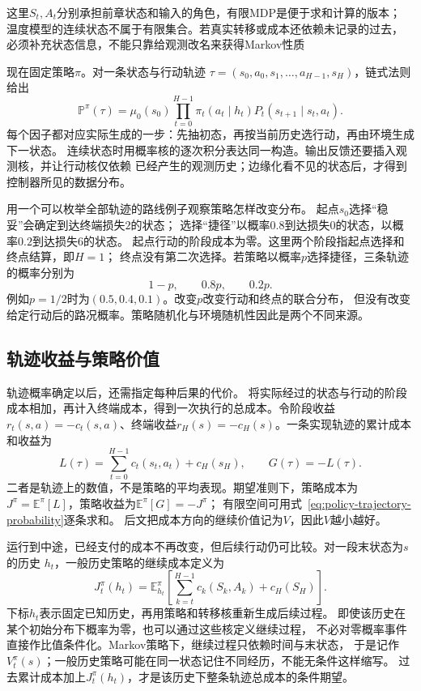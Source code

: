 这里$S_t,A_t$分别承担前章状态和输入的角色，有限MDP是便于求和计算的版本；
温度模型的连续状态不属于有限集合。若真实转移或成本还依赖未记录的过去，
必须补充状态信息，不能只靠给观测改名来获得Markov性质

现在固定策略$\pi$。对一条状态与行动轨迹
$\tau=(s_0,a_0,s_1,\ldots,a_{H-1},s_H)$，链式法则给出
\begin{equation}
  \mathbb P^\pi(\tau)
  =\mu_0(s_0)\prod_{t=0}^{H-1}
    \pi_t(a_t\mid h_t)P_t(s_{t+1}\mid s_t,a_t).
  \label{eq:policy-trajectory-probability}
\end{equation}
每个因子都对应实际生成的一步：先抽初态，再按当前历史选行动，再由环境生成下一状态。
连续状态时用概率核的逐次积分表达同一构造。输出反馈还要插入观测核，并让行动核仅依赖
已经产生的观测历史；边缘化看不见的状态后，才得到控制器所见的数据分布。

用一个可以枚举全部轨迹的路线例子观察策略怎样改变分布。
起点$s_0$选择“稳妥”会确定到达终端损失$2$的状态；
选择“捷径”以概率$0.8$到达损失$0$的状态，以概率$0.2$到达损失$6$的状态。
起点行动的阶段成本为零。这里两个阶段指起点选择和终点结算，即$H=1$；
终点没有第二次选择。若策略以概率$p$选择捷径，三条轨迹的概率分别为
\[
  1-p,\qquad 0.8p,\qquad 0.2p.
\]
例如$p=1/2$时为$(0.5,0.4,0.1)$。改变$p$改变行动和终点的联合分布，
但没有改变给定行动后的路况概率。策略随机化与环境随机性因此是两个不同来源。

\subsection{轨迹收益与策略价值}
\label{sec:policy-trajectory-return}

轨迹概率确定以后，还需指定每种后果的代价。
将实际经过的状态与行动的阶段成本相加，再计入终端成本，得到一次执行的总成本。令阶段收益
$r_t(s,a)=-c_t(s,a)$、终端收益$r_H(s)=-c_H(s)$。一条实现轨迹的累计成本和收益为
\begin{equation}
  L(\tau)=\sum_{t=0}^{H-1}c_t(s_t,a_t)+c_H(s_H),
  \qquad G(\tau)=-L(\tau).
  \label{eq:policy-trajectory-cost-return}
\end{equation}
二者是轨迹上的数值，不是策略的平均表现。期望准则下，策略成本为
$J^\pi=\mathbb E^\pi[L]$，策略收益为$\mathbb E^\pi[G]=-J^\pi$；
有限空间可用式~\eqref{eq:policy-trajectory-probability}逐条求和。
后文把成本方向的继续价值记为$V$，因此$V$越小越好。

运行到中途，已经支付的成本不再改变，但后续行动仍可比较。对一段末状态为$s$的历史
$h_t$，一般历史策略的继续成本定义为
\begin{equation}
  J_t^\pi(h_t)=
  \mathbb E^\pi_{h_t}
  \left[\sum_{k=t}^{H-1}c_k(S_k,A_k)+c_H(S_H)\right].
  \label{eq:decision-finite-policy-value}
\end{equation}
下标$h_t$表示固定已知历史，再用策略和转移核重新生成后续过程。
即使该历史在某个初始分布下概率为零，也可以通过这些核定义继续过程，
不必对零概率事件直接作比值条件化。Markov策略下，继续过程只依赖时间与末状态，
于是记作$V_t^\pi(s)$；一般历史策略可能在同一状态记住不同经历，不能无条件这样缩写。
过去累计成本加上$J_t^\pi(h_t)$，才是该历史下整条轨迹总成本的条件期望。

